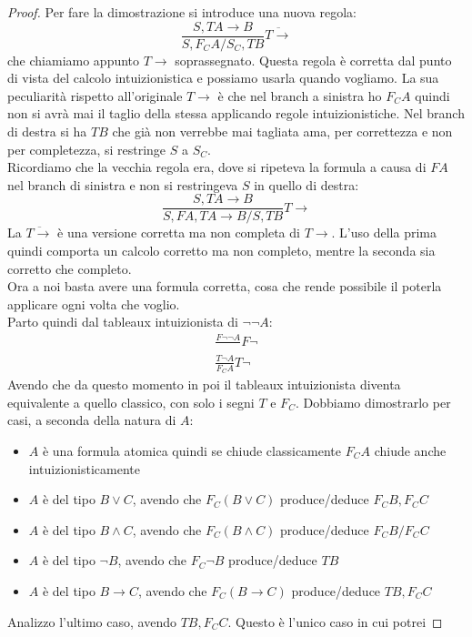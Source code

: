 \documentclass[a4paper,12pt, oneside]{book}
\begin{document}
\begin{proof}
  Per fare la dimostrazione si introduce una nuova regola:
  \[\frac{S, TA\to B}{S,F_CA/S_C, TB}\overline{T\to}\]
  che chiamiamo appunto $T\to$ soprassegnato. Questa regola è corretta dal punto
  di vista del calcolo intuizionistica e possiamo usarla quando vogliamo. La sua
  peculiarità rispetto all'originale $T\to$ è che nel branch a sinistra ho $F_C
  A$ quindi non si avrà mai il taglio della stessa applicando regole
  intuizionistiche. Nel branch di destra si ha $TB$ che già non verrebbe mai
  tagliata ama, per correttezza e non per completezza, si restringe $S$ a
  $S_C$.\\
  Ricordiamo che la vecchia regola era, dove si ripeteva la formula a causa di
  $FA$ nel branch di sinistra e non si restringeva $S$ in quello di destra:
  \[\frac{S, TA\to B}{S,FA, TA\to B/S, TB}T\to\]
  La $\overline{T\to}$ è una versione corretta ma non completa di $T\to$. L'uso
  della prima quindi comporta un calcolo corretto ma non completo, mentre la
  seconda sia corretto che completo.\\
  Ora a noi basta avere una formula corretta, cosa che rende possibile il
  poterla applicare ogni volta che voglio.\\
  Parto quindi dal tableaux intuizionista di $\neg\neg A$:
  \begin{gather*}
    \frac{F\neg\neg A}{}F\neg\\
    \frac{T\neg A}{F_C A}T\neg
  \end{gather*}
  Avendo che da questo momento in poi il tableaux intuizionista diventa
  equivalente a quello classico, con solo i segni $T$ e $F_C$. Dobbiamo
  dimostrarlo per casi, a seconda della natura di $A$:
  \begin{itemize}
    \item $A$ è una formula atomica quindi se chiude classicamente $F_CA$ chiude
    anche intuizionisticamente
    \item $A$ è del tipo $B\lor C$, avendo che $F_C (B\lor C)$ produce/deduce
    $F_CB,F_CC$
    \item $A$ è del tipo $B\land C$, avendo che $F_C (B\land C)$ produce/deduce
    $F_CB/F_CC$
    \item $A$ è del tipo $\neg B$, avendo che $F_C \neg B$ produce/deduce $TB$
    \item $A$ è del tipo $B\to C$, avendo che $F_C (B\to C)$ produce/deduce
    $TB,F_CC$
  \end{itemize}
  Analizzo l'ultimo caso, avendo $TB,F_CC$. Questo è l'unico caso in cui potrei

\end{proof}
\end{document}
